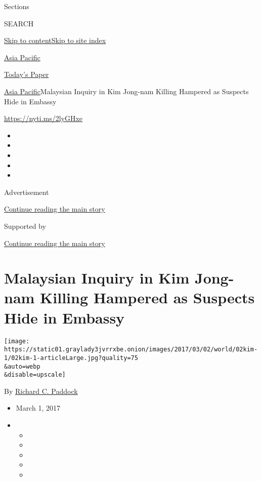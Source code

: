 Sections

SEARCH

\protect\hyperlink{site-content}{Skip to
content}\protect\hyperlink{site-index}{Skip to site index}

\href{https://www.nytimes3xbfgragh.onion/section/world/asia}{Asia
Pacific}

\href{https://myaccount.nytimes3xbfgragh.onion/auth/login?response_type=cookie\&client_id=vi}{}

\href{https://www.nytimes3xbfgragh.onion/section/todayspaper}{Today's
Paper}

\href{/section/world/asia}{Asia Pacific}\textbar{}Malaysian Inquiry in
Kim Jong-nam Killing Hampered as Suspects Hide in Embassy

\url{https://nyti.ms/2lyGHxe}

\begin{itemize}
\item
\item
\item
\item
\item
\end{itemize}

Advertisement

\protect\hyperlink{after-top}{Continue reading the main story}

Supported by

\protect\hyperlink{after-sponsor}{Continue reading the main story}

\hypertarget{malaysian-inquiry-in-kim-jong-nam-killing-hampered-as-suspects-hide-in-embassy}{%
\section{Malaysian Inquiry in Kim Jong-nam Killing Hampered as Suspects
Hide in
Embassy}\label{malaysian-inquiry-in-kim-jong-nam-killing-hampered-as-suspects-hide-in-embassy}}

\texttt{[image: https://static01.graylady3jvrrxbe.onion/images/2017/03/02/world/02kim-1/02kim-1-articleLarge.jpg?quality=75\\\&auto=webp\\\&disable=upscale]}

By
\href{https://www.nytimes3xbfgragh.onion/by/richard-c-paddock}{Richard
C. Paddock}

\begin{itemize}
\item
  March 1, 2017
\item
  \begin{itemize}
  \item
  \item
  \item
  \item
  \item
  \end{itemize}
\end{itemize}


